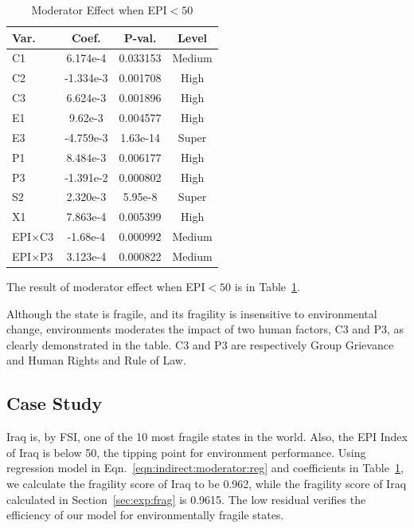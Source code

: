 \begin{table}[htbp]
\centering        
\small
   \begin{tabular}{|l|ccc|}\hline
    Var. & Coef. & P-val. & Level \\ \hline
      C1 & 6.174e-4 & 0.033153 & Medium \\ \hline
      C2 & -1.334e-3 & 0.001708 & High \\ \hline
      C3 & 6.624e-3 & 0.001896 & High \\ \hline
      E1 & 9.62e-3 & 0.004577 & High \\ \hline
      E3 & -4.759e-3 & 1.63e-14 & Super \\ \hline
      P1 & 8.484e-3 & 0.006177 & High \\ \hline
      P3 & -1.391e-2 & 0.000802 & High \\ \hline
      S2 & 2.320e-3 & 5.95e-8 & Super \\ \hline
      X1 & 7.863e-4 & 0.005399 & High \\ \hline
      EPI$\times$C3 & -1.68e-4 & 0.000992 & Medium \\ \hline
      EPI$\times$P3 & 3.123e-4 & 0.000822 & Medium \\ \hline
   \end{tabular}
   \caption{Moderator Effect when EPI$<50$}
   \label{tab:exp:indirect:moderator:case2}
\end{table}

 The result of moderator effect when EPI$<50$ is in Table~\ref{tab:exp:indirect:moderator:case2}.

Although the state is fragile, and its fragility is insensitive to environmental change, environments moderates the impact of two human factors, C3 and P3, as clearly demonstrated in the table. C3 and P3 are respectively Group Grievance and Human Rights and Rule of Law.

\subsection{Case Study}
Iraq is, by FSI, one of the 10 most fragile states in the world. 
Also, the EPI Index of Iraq is below 50, the tipping point for environment performance. 
Using regression model in Eqn.~\ref{eqn:indirect:moderator:reg} and coefficients in Table~\ref{tab:exp:indirect:moderator:case2}, we calculate the fragility score of Iraq to be 0.962, while the fragility score of Iraq calculated in Section~\ref{sec:exp:frag} is 0.9615. The low residual verifies the efficiency of our model for environmentally fragile states.


